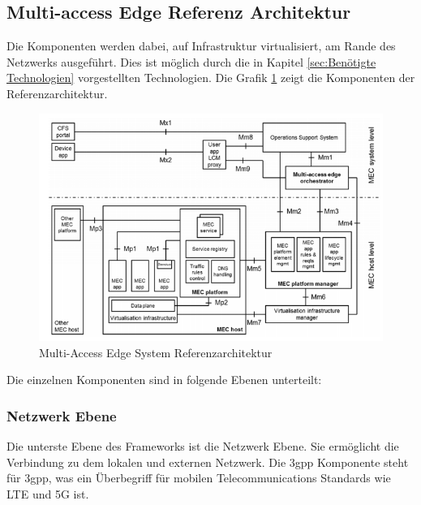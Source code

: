 \documentclass[runningheads]{llncs}
\numberwithin{figure}{section}
\begin{document}
\subsection{Multi-access Edge Referenz Architektur}
Die Komponenten werden dabei, auf Infrastruktur virtualisiert, am Rande des Netzwerks ausgeführt. 
Dies ist möglich durch die in Kapitel \ref{sec:Benötigte Technologien} vorgestellten Technologien.
Die Grafik \ref{fig:mecarchitecture} zeigt die Komponenten der Referenzarchitektur.
\begin{figure}
  \includegraphics[width=\linewidth]{images/mecarchitecture.png}
  \caption{Multi-Access Edge System Referenzarchitektur \cite{etsiMultiaccessEdgeComputinga}}
  \label{fig:mecarchitecture}
\end{figure}
Die einzelnen Komponenten sind in folgende Ebenen unterteilt:
\subsubsection{Netzwerk Ebene}
Die unterste Ebene des Frameworks ist die Netzwerk Ebene. Sie ermöglicht die Verbindung zu dem lokalen und 
externen Netzwerk. Die \acrshort{3gpp} Komponente steht für \acrlong{3gpp}, was ein Überbegriff für mobilen
Telecommunications Standards wie LTE und 5G ist. 
\end{document}

